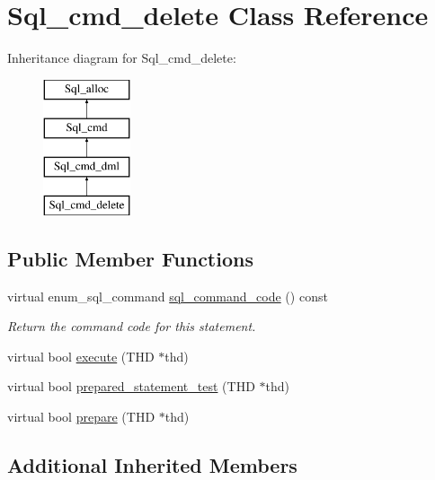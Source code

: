 \hypertarget{classSql__cmd__delete}{}\section{Sql\+\_\+cmd\+\_\+delete Class Reference}
\label{classSql__cmd__delete}
Inheritance diagram for Sql\+\_\+cmd\+\_\+delete\+:\begin{figure}[H]
\begin{center}
\leavevmode
\includegraphics[height=4.000000cm]{classSql__cmd__delete}
\end{center}
\end{figure}
\subsection*{Public Member Functions}
\begin{DoxyCompactItemize}
\item 
\mbox{\label{classSql__cmd__delete_ae462d171ae952267d9618dee3be4cdec}} 
virtual enum\+\_\+sql\+\_\+command \mbox{\hyperlink{classSql__cmd__delete_ae462d171ae952267d9618dee3be4cdec}{sql\+\_\+command\+\_\+code}} () const
\begin{DoxyCompactList}\small\item\em Return the command code for this statement. \end{DoxyCompactList}\item 
virtual bool \mbox{\hyperlink{classSql__cmd__delete_aa04524eb8b0ecf5f8059fdd176990781}{execute}} (T\+HD $\ast$thd)
\item 
virtual bool \mbox{\hyperlink{classSql__cmd__delete_a9605fcb766fdc88c97d30ad9e02addd1}{prepared\+\_\+statement\+\_\+test}} (T\+HD $\ast$thd)
\item 
virtual bool \mbox{\hyperlink{classSql__cmd__delete_ad761a1c8d8c0412fddd38a3303986806}{prepare}} (T\+HD $\ast$thd)
\end{DoxyCompactItemize}
\subsection*{Additional Inherited Members}


